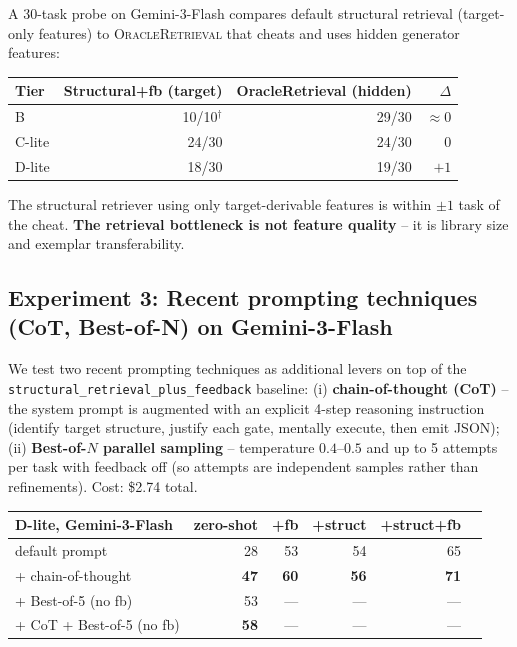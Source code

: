 \documentclass[11pt]{article}
\begin{document}
A 30-task probe on Gemini-3-Flash compares default structural retrieval (target-only features) to \textsc{OracleRetrieval} that cheats and uses hidden generator features:

\begin{center}\small
\begin{tabular}{lrrr}
\toprule
\textbf{Tier} & \textbf{Structural+fb (target)} & \textbf{OracleRetrieval (hidden)} & $\Delta$ \\
\midrule
B & 10/10$^\dagger$ & 29/30 & $\approx 0$ \\
C-lite & 24/30 & 24/30 & 0 \\
D-lite & 18/30 & 19/30 & $+1$ \\
\bottomrule
\end{tabular}
\end{center}

The structural retriever using only target-derivable features is within $\pm1$ task of the cheat. \textbf{The retrieval bottleneck is not feature quality} -- it is library size and exemplar transferability.

\subsection{Experiment 3: Recent prompting techniques (CoT, Best-of-N) on Gemini-3-Flash}

We test two recent prompting techniques as additional levers on top of the
\texttt{structural\_retrieval\_plus\_feedback} baseline: (i) \textbf{chain-of-thought (CoT)}
-- the system prompt is augmented with an explicit 4-step reasoning instruction
(identify target structure, justify each gate, mentally execute, then emit
JSON); (ii) \textbf{Best-of-$N$ parallel sampling} -- temperature $0.4$--$0.5$ and
up to 5 attempts per task with feedback off (so attempts are independent
samples rather than refinements). Cost: \$2.74 total.

\begin{center}\small
\begin{tabular}{lrrrrr}
\toprule
\textbf{D-lite, Gemini-3-Flash} & \textbf{zero-shot} & \textbf{+fb} & \textbf{+struct} & \textbf{+struct+fb} \\
\midrule
default prompt          & 28 & 53 & 54 & 65 \\
+ chain-of-thought      & \textbf{47} & \textbf{60} & \textbf{56} & \textbf{71} \\
+ Best-of-5 (no fb)     & 53 & --- & --- & --- \\
+ CoT + Best-of-5 (no fb) & \textbf{58} & --- & --- & --- \\
\bottomrule
\end{tabular}
\end{center}
\end{document}
